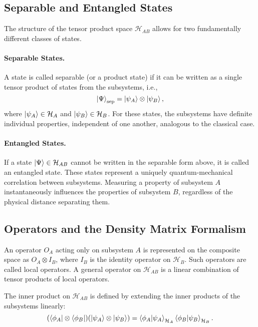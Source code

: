 \subsection{Separable and Entangled States}
\label{sub:separable_entangled}

The structure of the tensor product space $\mathcal{H}_{AB}$ allows for two
fundamentally different classes of states.

\paragraph{Separable States.}
A state is called separable (or a product state) if it
can be written as a single tensor product of states from the subsystems,
i.e.,
\begin{equation}
	\ket{\Psi}_{\text{sep}} = \ket{\psi_A} \otimes \ket{\psi_B},
\end{equation}
where $\ket{\psi_A} \in \mathcal{H}_A$ and $\ket{\psi_B} \in \mathcal{H}_B$.
For these states, the subsystems have definite individual properties,
independent of one another, analogous to the classical case.

\paragraph{Entangled States.}
If a state $\ket{\Psi} \in \mathcal{H}_{AB}$ cannot be written in the
separable form above, it is called an entangled state. These states
represent a uniquely quantum-mechanical correlation between subsystems.
Measuring a property of subsystem $A$ instantaneously influences the
properties of subsystem $B$, regardless of the physical distance
separating them.

\subsection{Operators and the Density Matrix Formalism}
\label{sub:operators_density}

An operator $O_A$ acting only on subsystem $A$ is represented on the
composite space as $O_A \otimes I_B$, where $I_B$ is the
identity operator on $\mathcal{H}_B$. Such operators are called
local operators. A general operator on $\mathcal{H}_{AB}$ is a
linear combination of tensor products of local operators.

The inner product on $\mathcal{H}_{AB}$ is defined by extending the inner
products of the subsystems linearly:
\begin{equation}
	(\bra{\phi_A} \otimes \bra{\phi_B}) (\ket{\psi_A} \otimes \ket{\psi_B})
	= \braket{\phi_A | \psi_A}_{\mathcal{H}_A} \braket{\phi_B | \psi_B}_{\mathcal{H}_B}.
\end{equation}

